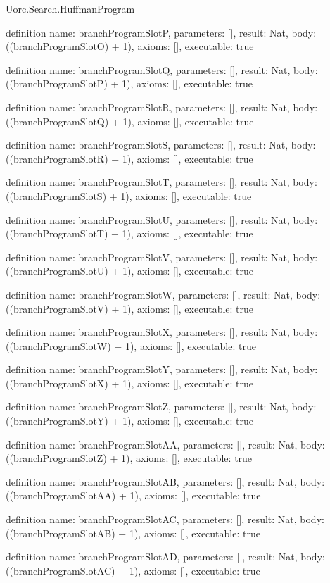 \begin{lexlean}{Uorc.Search.HuffmanProgram}
\begin{semanticmodule}
definition{
  name: branchProgramSlotP,
  parameters: [],
  result: Nat,
  body: ((branchProgramSlotO) + 1),
  axioms: [],
  executable: true
}

definition{
  name: branchProgramSlotQ,
  parameters: [],
  result: Nat,
  body: ((branchProgramSlotP) + 1),
  axioms: [],
  executable: true
}

definition{
  name: branchProgramSlotR,
  parameters: [],
  result: Nat,
  body: ((branchProgramSlotQ) + 1),
  axioms: [],
  executable: true
}

definition{
  name: branchProgramSlotS,
  parameters: [],
  result: Nat,
  body: ((branchProgramSlotR) + 1),
  axioms: [],
  executable: true
}

definition{
  name: branchProgramSlotT,
  parameters: [],
  result: Nat,
  body: ((branchProgramSlotS) + 1),
  axioms: [],
  executable: true
}

definition{
  name: branchProgramSlotU,
  parameters: [],
  result: Nat,
  body: ((branchProgramSlotT) + 1),
  axioms: [],
  executable: true
}

definition{
  name: branchProgramSlotV,
  parameters: [],
  result: Nat,
  body: ((branchProgramSlotU) + 1),
  axioms: [],
  executable: true
}

definition{
  name: branchProgramSlotW,
  parameters: [],
  result: Nat,
  body: ((branchProgramSlotV) + 1),
  axioms: [],
  executable: true
}

definition{
  name: branchProgramSlotX,
  parameters: [],
  result: Nat,
  body: ((branchProgramSlotW) + 1),
  axioms: [],
  executable: true
}

definition{
  name: branchProgramSlotY,
  parameters: [],
  result: Nat,
  body: ((branchProgramSlotX) + 1),
  axioms: [],
  executable: true
}

definition{
  name: branchProgramSlotZ,
  parameters: [],
  result: Nat,
  body: ((branchProgramSlotY) + 1),
  axioms: [],
  executable: true
}

definition{
  name: branchProgramSlotAA,
  parameters: [],
  result: Nat,
  body: ((branchProgramSlotZ) + 1),
  axioms: [],
  executable: true
}

definition{
  name: branchProgramSlotAB,
  parameters: [],
  result: Nat,
  body: ((branchProgramSlotAA) + 1),
  axioms: [],
  executable: true
}

definition{
  name: branchProgramSlotAC,
  parameters: [],
  result: Nat,
  body: ((branchProgramSlotAB) + 1),
  axioms: [],
  executable: true
}

definition{
  name: branchProgramSlotAD,
  parameters: [],
  result: Nat,
  body: ((branchProgramSlotAC) + 1),
  axioms: [],
  executable: true
}


\end{semanticmodule}
\end{lexlean}

